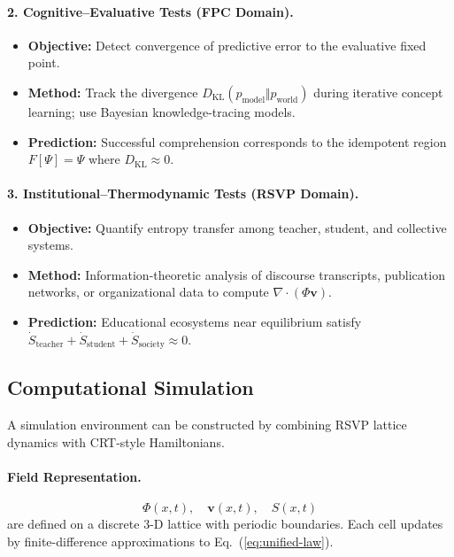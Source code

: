 \documentclass[12pt,a4paper]{article}
\begin{document}
\paragraph{2. Cognitive–Evaluative Tests (FPC Domain).}
\begin{itemize}[leftmargin=1.2em]
  \item \textbf{Objective:} Detect convergence of predictive error to the evaluative fixed point.
  \item \textbf{Method:} Track the divergence $D_{\mathrm{KL}}(p_{\text{model}}\Vert p_{\text{world}})$ during iterative concept learning; use Bayesian knowledge-tracing models.
  \item \textbf{Prediction:} Successful comprehension corresponds to the idempotent region $F[\Psi]=\Psi$ where $D_{\mathrm{KL}}\!\approx\!0$.
\end{itemize}

\paragraph{3. Institutional–Thermodynamic Tests (RSVP Domain).}
\begin{itemize}[leftmargin=1.2em]
  \item \textbf{Objective:} Quantify entropy transfer among teacher, student, and collective systems.
  \item \textbf{Method:} Information-theoretic analysis of discourse transcripts, publication networks, or organizational data to compute $\nabla\!\cdot(\Phi\mathbf{v})$.
  \item \textbf{Prediction:} Educational ecosystems near equilibrium satisfy 
  $\dot S_{\mathrm{teacher}}+\dot S_{\mathrm{student}}+\dot S_{\mathrm{society}}\!\approx\!0$.
\end{itemize}

\subsection{Computational Simulation}

A simulation environment can be constructed by combining RSVP lattice dynamics with CRT-style Hamiltonians.

\paragraph{Field Representation.}
\[
\Phi(x,t),\quad \mathbf{v}(x,t),\quad S(x,t)
\]
are defined on a discrete 3-D lattice with periodic boundaries.  Each cell updates by finite-difference approximations to Eq.~(\ref{eq:unified-law}).
\end{document}
